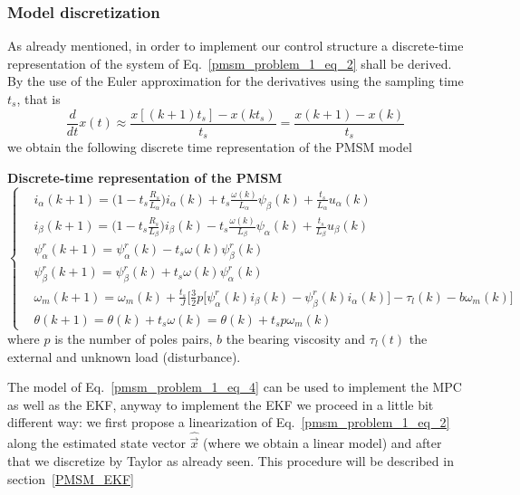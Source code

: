\documentclass[11pt,a4paper,oneside]{book}
\numberwithin{equation}{section}
\theoremstyle{it}
\theoremstyle{definition}
\begin{document}
\subsubsection{Model discretization}
As already mentioned, in order to implement our control structure a discrete-time representation 
of the system of Eq.~\eqref{pmsm_problem_1_eq_2} shall be derived. By the use of 
the Euler approximation for the derivatives using the sampling time $t_s$, that is 
\begin{equation}\label{pmsm_problem_1_eq_3}
	\frac{d}{dt}x(t)\approx\frac{x[(k+1)t_s]-x(kt_s)}{t_s}=\frac{x(k+1)-x(k)}{t_s}
\end{equation}
we obtain the following discrete time representation of the PMSM model
\begin{mybox}
	\textbf{Discrete-time representation of the PMSM}
	\begin{equation}\label{pmsm_problem_1_eq_4}
		\left\lbrace \begin{aligned}
			& i_\alpha(k+1)=\Big(1-t_s\frac{R_s}{L_\alpha}\Big) i_\alpha(k) 
			+t_s\frac{\omega(k)}{L_\alpha}\psi_\beta(k)+\frac{t_s}{L_\alpha}u_\alpha(k)
			\\[6pt]
			& i_\beta(k+1) = \Big(1-t_s\frac{R_s}{L_\beta}\Big)i_\beta(k) 
			-t_s\frac{\omega(k)}{L_\beta}\psi_\alpha(k)+\frac{t_s}{L_\beta}u_\beta(k)
			\\[6pt]
			&\psi_\alpha^r(k+1) = \psi_\alpha^r(k) -t_s\omega(k)\psi_\beta^r(k) 
			\\[6pt]
			&\psi_\beta^r(k+1) = \psi_\beta^r(k) + t_s\omega(k)\psi_\alpha^r(k) 
			\\[6pt]
			&\omega_m(k+1) = \omega_m(k) + \frac{t_s}{J}\Bigg[\frac{3}{2}p 
			\Big[\psi^r_{\alpha}(k)i_{\beta}(k)-\psi^r_{\beta}(k)i_{\alpha}(k)\Big] 
			-\tau_l(k) -b{\omega}_m(k) \Bigg]\\[6pt]
			& {\theta}(k+1) = {\theta}(k) + t_s\omega(k) ={\theta}(k) + t_s 
			p\omega_m(k)
		\end{aligned} \right. 
	\end{equation}
	where $p$ is the number of poles pairs, $b$ the bearing viscosity and 
	$\tau_l(t)$ the external and unknown load (disturbance).
\end{mybox}
The model of Eq.~\eqref{pmsm_problem_1_eq_4} can be used to implement the MPC as well as the EKF, anyway to implement the EKF we proceed in a little bit different way: we first propose a linearization of Eq.~\eqref{pmsm_problem_1_eq_2} along the estimated state vector $\hat{\vec{x}}$ (where we obtain a linear model) and after that we discretize by Taylor as already seen. This procedure will be described in section~\ref{PMSM_EKF}
\end{document}
